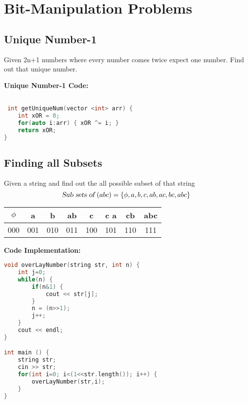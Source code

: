 \section{\textbf{Bit-Manipulation Problems}}

\subsection{Unique Number-1}
Given 2n+1 numbers where every number comes twice expect one number. Find out that unique number.

\begin{center}
\end{center}

\textbf{Unique Number-1 Code:}
\begin{lstlisting}[language=c++]

 int getUniqueNum(vector <int> arr) {
    int xOR = 0;
    for(auto i:arr) { xOR ^= i; }
    return xOR;
}
\end{lstlisting}

\subsection{Finding all Subsets}
Given a string and find out the all possible subset of that string
\begin{equation*}
	\textsl{Sub sets of } (abc) = \lbrace \phi, a, b, c, ab, ac, bc, abc \rbrace
\end{equation*}

\begin{center}
	\begin{tabular}{| c | c | c | c | c | c | c | c |}
	\hline
	$\phi $ &   a &  b  &  ab & c   & c a & cb  & abc \\ \hline
	000     & 001 & 010 & 011 & 100 & 101 & 110 & 111 \\
	\hline
	\end{tabular}
\end{center}

\textbf{Code Implementation:}
\begin{lstlisting}[language=c++]
void overLayNumber(string str, int n) {
    int j=0;
    while(n) {
        if(n&1) {
            cout << str[j];
        }
        n = (n>>1);
        j++;
    }
    cout << endl;
}

int main () {
    string str;
    cin >> str;
    for(int i=0; i<(1<<str.length()); i++) {
        overLayNumber(str,i);
    }
}

\end{lstlisting}

